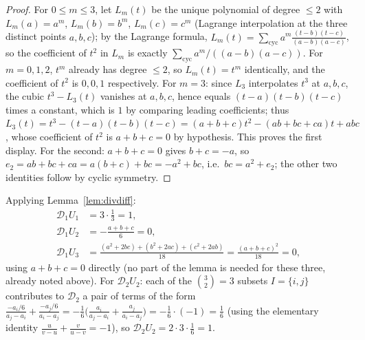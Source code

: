 \documentclass[11pt]{article}
\theoremstyle{remark}
\begin{document}
\begin{proof}
For $0\le m\le3$, let $L_m(t)$ be the unique polynomial of degree $\le2$ with $L_m(a)=a^m$, $L_m(b)=b^m$, $L_m(c)=c^m$ (Lagrange interpolation at the three distinct points $a,b,c$); by the Lagrange formula, $L_m(t)=\sum_{\mathrm{cyc}}a^m\frac{(t-b)(t-c)}{(a-b)(a-c)}$, so the coefficient of $t^2$ in $L_m$ is exactly $\sum_{\mathrm{cyc}}a^m/((a-b)(a-c))$. For $m=0,1,2$, $t^m$ already has degree $\le2$, so $L_m(t)=t^m$ identically, and the coefficient of $t^2$ is $0,0,1$ respectively. For $m=3$: since $L_3$ interpolates $t^3$ at $a,b,c$, the cubic $t^3-L_3(t)$ vanishes at $a,b,c$, hence equals $(t-a)(t-b)(t-c)$ times a constant, which is $1$ by comparing leading coefficients; thus $L_3(t)=t^3-(t-a)(t-b)(t-c)=(a+b+c)t^2-(ab+bc+ca)t+abc$, whose coefficient of $t^2$ is $a+b+c=0$ by hypothesis. This proves the first display. For the second: $a+b+c=0$ gives $b+c=-a$, so $e_2=ab+bc+ca=a(b+c)+bc=-a^2+bc$, i.e.\ $bc=a^2+e_2$; the other two identities follow by cyclic symmetry.
\end{proof}

Applying Lemma~\ref{lem:divdiff}:
\begin{align*}
\mathcal D_1U_1&=3\cdot\frac13=1,\\
\mathcal D_1U_2&=-\frac{a+b+c}{6}=0,\\
\mathcal D_1U_3&=\frac{(a^2+2bc)+(b^2+2ac)+(c^2+2ab)}{18}=\frac{(a+b+c)^2}{18}=0,
\end{align*}
using $a+b+c=0$ directly (no part of the lemma is needed for these three, already noted above). For $\mathcal D_2U_2$: each of the $\binom32=3$ subsets $I=\{i,j\}$ contributes to $\mathcal D_2$ a pair of terms of the form $\frac{-a_i/6}{a_j-a_i}+\frac{-a_j/6}{a_i-a_j}=-\frac16\Big(\frac{a_i}{a_j-a_i}+\frac{a_j}{a_i-a_j}\Big)=-\frac16\cdot(-1)=\frac16$ (using the elementary identity $\frac{u}{v-u}+\frac{v}{u-v}=-1$), so $\mathcal D_2U_2 = 2\cdot3\cdot\frac16 = 1$.
\end{document}
